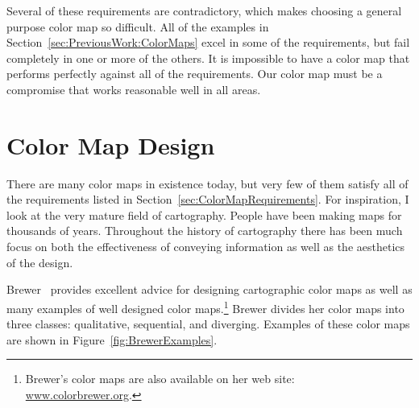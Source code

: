 \documentclass[twocolumn]{article}
\newcommand{\scite}[1]{~\cite{#1}}
\begin{document}

Several of these requirements are contradictory, which makes choosing a
general purpose color map so difficult.  All of the examples in
Section~\ref{sec:PreviousWork:ColorMaps} excel in some of the requirements,
but fail completely in one or more of the others.  It is impossible to have
a color map that performs perfectly against all of the requirements.  Our color
map must be a compromise that works reasonable well in all areas.


\section{Color Map Design}
\label{sec:ColorMapDesign}

There are many color maps in existence today, but very few of them satisfy
all of the requirements listed in Section~\ref{sec:ColorMapRequirements}.
For inspiration, I look at the very mature field of cartography.  People
have been making maps for thousands of years.  Throughout the history of
cartography there has been much focus on both the effectiveness of
conveying information as well as the aesthetics of the design.

Brewer\scite{Brewer05} provides excellent advice for designing cartographic
color maps as well as many examples of well designed color
maps.\footnote{Brewer's color maps are also available on her web site:
  \href{http://www.colorbrewer.org}{www.colorbrewer.org}.} Brewer divides
her color maps into three classes: qualitative, sequential, and diverging.
Examples of these color maps are shown in Figure~\ref{fig:BrewerExamples}.
\end{document}
